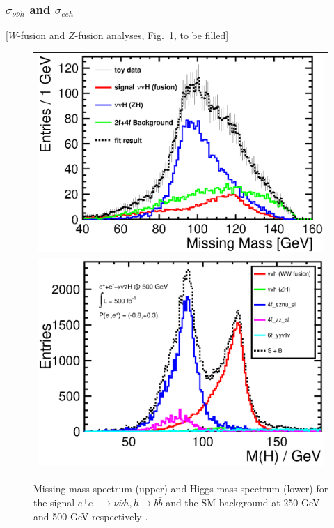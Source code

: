\subsubsection{$\sigma_{\nu\bar{\nu}h}$ and $\sigma_{eeh}$}
[$W$-fusion and $Z$-fusion analyses, Fig.~\ref{fig:vvHbb}, to be filled]
\begin{figure}
\begin{tabular}[c]{c}
\includegraphics[width=0.85\hsize]{chapters/figures/vvH_MissingMass250.eps} \\
\includegraphics[width=0.85\hsize]{chapters/figures/vvH_MassH500.eps}
\end{tabular}
  \caption{Missing mass spectrum (upper) and Higgs mass spectrum (lower) 
  for the signal $e^+e^-\to\nu\bar\nu h, h\to b \bar{b}$ and the SM background 
  at 250 GeV and 500 GeV respectively \cite{H2bb1,H2bb2}.}
  \label{fig:vvHbb}
\end{figure}

